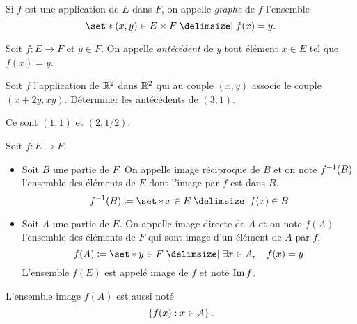 \documentclass{magnolia}
\begin{document}

\begin{definition}[utile=-3]
Si $f$ est une application de $E$ dans $F$, on appelle \emph{graphe} de $f$ l'ensemble
\[\enstq{\p{x,y}\in E\times F}{f(x)=y}.\]
\end{definition}

\begin{definition}[utile=-3]
Soit $f:E\to F$ et $y\in F$. On appelle \emph{antécédent} de $y$ tout élément $x\in E$
tel que $f(x)=y$.  
\end{definition}


\begin{exoUnique}
\exo Soit $f$ l'application de $\mathbb{R}^2$ dans $\mathbb{R}^2$ qui au couple $(x,y)$
  associe le couple $(x+2y,xy)$. Déterminer les antécédents de $(3,1)$.
  \begin{sol}
  Ce sont $(1,1)$ et $(2,1/2)$.
  \end{sol}
\end{exoUnique}

\begin{definition}[utile=-3]
Soit $f:E\to F$.
\begin{itemize}
\item Soit $B$ une partie de $F$. On appelle image réciproque de $B$
  et on note $f^{-1} (B)$ l'ensemble des éléments de $E$
  dont l'image par $f$ est dans $B$.
  \[f^\applirec (B)\defeq\enstq{x\in E}{f(x)\in B}\]
\item Soit $A$ une partie de $E$. On appelle image directe de $A$ 
  et on note $f(A)$ l'ensemble des éléments de $F$ qui sont
  image d'un élément de $A$ par $f$.
  \[f(A)\defeq\enstq{y\in F}{\exists x\in A \qsep f(x)=y}\]  
  L'ensemble $f(E)$ est appelé image de $f$ et noté $\operatorname{Im} f$.
\end{itemize}
\end{definition}

\begin{remarqueUnique}
\remarque L'ensemble image $f(A)$ est aussi noté
  \[\left\{f(x) : x\in A\right\}.\]
\end{remarqueUnique}
\end{document}
